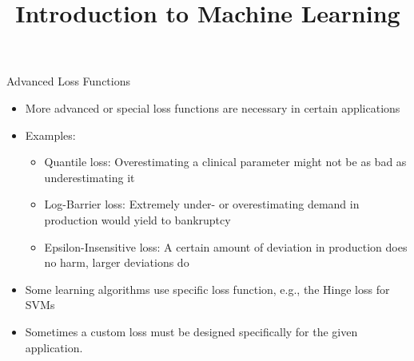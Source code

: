 




\newcommand{\titlefigure}{figure_man/optimization_steps.jpeg}
\newcommand{\learninggoals}{
  \item Know the Log-Barrier loss
  \item Know the Epsilon-Insensitive loss
  \item Know the Quantile Loss
}

\title{Introduction to Machine Learning}
\date{}





\begin{vbframe}{Advanced Loss Functions}
\begin{itemize}
\item More advanced or special loss functions are necessary in certain applications
\item Examples:
\begin{itemize}
\item Quantile loss: Overestimating a clinical parameter might not be as bad as underestimating it
\item Log-Barrier loss: Extremely under- or overestimating demand in production would yield to bankruptcy
\item Epsilon-Insensitive loss: A certain amount of deviation in production does no harm, larger deviations do
\end{itemize}
\item Some learning algorithms use specific loss function, e.g., the Hinge loss for SVMs
\item Sometimes a custom loss must be designed specifically for the given application.
\end{itemize}
\end{vbframe}


